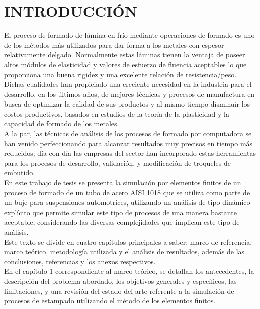 \chapter*{INTRODUCCIÓN}


El proceso de formado de lámina en frío mediante operaciones de formado es uno de los métodos más 
utilizados para dar forma a los metales con espesor relativamente delgado. Normalmente estas láminas 
tienen la ventaja de poseer altos módulos de elasticidad y valores de esfuerzo de fluencia aceptables 
lo que proporciona una buena rigidez y una excelente relación de resistencia/peso. Dichas cualidades 
han propiciado una creciente necesidad en la industria para el desarrollo, en los últimos años, 
de mejores técnicas y procesos de manufactura en busca de optimizar la calidad de sus productos y al 
mismo tiempo disminuir los costos productivos, basados en estudios de la teoría de la plasticidad y la 
capacidad de formado de los metales.\\

A la par, las técnicas de análisis de los procesos de formado por computadora se han venido 
perfeccionando para alcanzar resultados muy precisos en tiempo más reducidos; día con día las 
empresas del sector han incorporado estas herramientas para los procesos de desarrollo, validación, 
y modificación de troqueles de embutido.\\

En este trabajo de tesis se presenta la simulación por elementos finitos de un proceso de formado 
de un tubo de acero AISI 1018 que se utiliza como parte de un buje para suspensiones automotrices, 
utilizando un análisis de tipo dinámico explícito que permite simular este tipo de procesos 
de una manera bastante aceptable, considerando las diversas complejidades que implican este tipo 
de análisis.\\

Este texto se divide en cuatro capítulos principales a saber: marco de referencia, marco teórico, 
metodología utilizada y el análisis de resultados, además de las conclusiones, referencias y 
los anexos respectivos.\\

En el capítulo 1 correspondiente al marco teórico, se detallan los antecedentes, la descripción 
del problema abordado, los objetivos generales y específicos, las limitaciones, y una 
revisión del estado del arte referente a la simulación de procesos de estampado utilizando 
el método de los elementos finitos.\\

